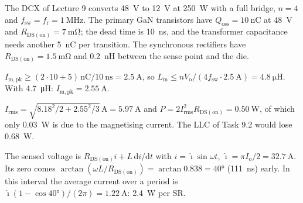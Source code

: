 

The DCX of Lecture 9 converts \SI{48}{\volt} to \SI{12}{\volt} at \SI{250}{\watt} with a full bridge, $n=4$ and $f_\mathrm{sw}=f_\mathrm{r}=\SI{1}{\mega\hertz}$. The primary GaN transistors have $Q_\mathrm{oss}=\SI{10}{\nano\coulomb}$ at \SI{48}{\volt} and $R_\mathrm{DS(on)}=\SI{7}{\milli\ohm}$; the dead time is \SI{10}{\nano\second}, and the transformer capacitance needs another \SI{5}{\nano\coulomb} per transition. The synchronous rectifiers have $R_\mathrm{DS(on)}=\SI{1.5}{\milli\ohm}$ and \SI{0.2}{\nano\henry} between the sense point and the die.


\begin{solutionblock}
	$I_\mathrm{m,pk}\geq(2\cdot10+5)\,\si{\nano\coulomb}/\SI{10}{\nano\second}=\SI{2.5}{\ampere}$, so $L_\mathrm{m}\leq nV_\mathrm{o}/(4f_\mathrm{sw}\cdot\SI{2.5}{\ampere})=\SI{4.8}{\micro\henry}$. With \SI{4.7}{\micro\henry}: $I_\mathrm{m,pk}=\SI{2.55}{\ampere}$.
\end{solutionblock}


\begin{solutionblock}
	$I_\mathrm{rms}=\sqrt{8.18^2/2+2.55^2/3}\,\si{\ampere}=\SI{5.97}{\ampere}$ and $P=2I_\mathrm{rms}^2R_\mathrm{DS(on)}=\SI{0.50}{\watt}$, of which only \SI{0.03}{\watt} is due to the magnetising current. The LLC of Task 9.2 would lose \SI{0.68}{\watt}.
\end{solutionblock}


\begin{solutionblock}
	The sensed voltage is $R_\mathrm{DS(on)}i+L\,\mathrm{d}i/\mathrm{d}t$ with $i=\hat{\imath}\sin\omega t$, $\hat{\imath}=\pi I_\mathrm{o}/2=\SI{32.7}{\ampere}$. Its zero comes $\arctan(\omega L/R_\mathrm{DS(on)})=\arctan0.838=\ang{40}$ (\SI{111}{\nano\second}) early. In this interval the average current over a period is $\hat{\imath}(1-\cos\ang{40})/(2\pi)=\SI{1.22}{\ampere}$: \SI{2.4}{\watt} per SR.
\end{solutionblock}

